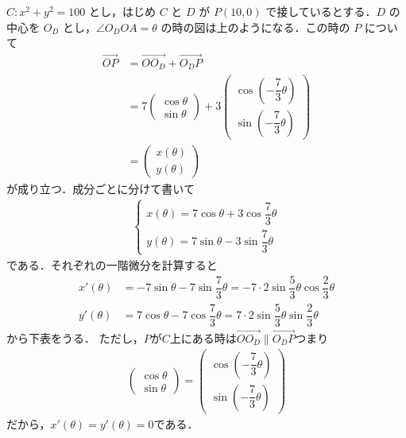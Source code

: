 \documentclass[../../main.tex]{subfiles}
\begin{document}
$C: x^2 + y^2 = 100$ とし，はじめ $C$ と $D$ が $P(10, 0)$ で接しているとする．$D$ の中心を $O_D$ とし，$\angle O_D O A = \theta$ の時の図は上のようになる．この時の $P$ について
\begin{align}
  \overrightarrow{OP}
  &= \overrightarrow{OO_D}+\overrightarrow{O_DP} \\
  &= 7
  \begin{pmatrix} \cos\theta \\ \sin\theta
  \end{pmatrix} + 3
  \begin{pmatrix} \cos(-\dfrac{7}{3}\theta) \\ \sin(-\dfrac{7}{3}\theta)
  \end{pmatrix} \\
  &=
  \begin{pmatrix} x(\theta) \\ y(\theta)
  \end{pmatrix}
\end{align}
が成り立つ．成分ごとに分けて書いて
\begin{align}
  \begin{cases}
    x(\theta) = 7\cos\theta + 3\cos\dfrac{7}{3}\theta \\
    y(\theta) = 7\sin\theta - 3\sin\dfrac{7}{3}\theta
  \end{cases} \label{eq:1}
\end{align}
である．それぞれの一階微分を計算すると
\begin{align}
  x'(\theta)
  &= -7\sin\theta - 7\sin\dfrac{7}{3}\theta
  = -7 \cdot 2 \sin\dfrac{5}{3}\theta \cos\dfrac{2}{3}\theta \\
  y'(\theta)
  &= 7\cos\theta - 7\cos\dfrac{7}{3}\theta
  = 7 \cdot 2 \sin\dfrac{5}{3}\theta \sin\dfrac{2}{3}\theta
\end{align}
から下表をうる．
ただし，$P$が$C$上にある時は$\overrightarrow{OO_D} \parallel \overrightarrow{O_DP}$つまり
\begin{align}
  \begin{pmatrix} \cos\theta \\ \sin\theta
  \end{pmatrix} =
  \begin{pmatrix} \cos(-\dfrac{7}{3}\theta) \\ \sin(-\dfrac{7}{3}\theta)
  \end{pmatrix}
\end{align}
だから，$x'(\theta)=y'(\theta)=0$である．
\end{document}
